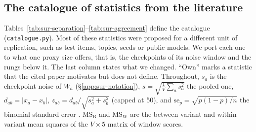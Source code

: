 \subsection{The catalogue of statistics from the literature}
\label{app:sur-catalogue}

Tables~\ref{tab:sur-separation}--\ref{tab:sur-agreement} define the catalogue (\texttt{catalogue.py}).
Most of these statistics were proposed for a different unit of replication, such as test items, topics, seeds or public models.
We port each one to what one proxy size offers, that is, the checkpoints of its noise window and the rungs below it. The last column states what we changed.
``Own'' marks a statistic that the cited paper motivates but does not define.
Throughout, $s_a$ is the checkpoint noise of $W_a$ (\S\ref{app:sur-notation}), $s = \sqrt{\frac{1}{V}\sum_a s_a^2}$ the pooled one, $d_{ab} = |x_a - x_b|$, $z_{ab} = d_{ab}/\sqrt{s_a^2 + s_b^2}$ (capped at 50), and $\mathrm{se}_p = \sqrt{p(1-p)/n}$ the binomial standard error \citep{miller_adding_2024}.
$\mathrm{MS_B}$ and $\mathrm{MS_W}$ are the between-variant and within-variant mean squares of the $V \times 5$ matrix of window scores.

